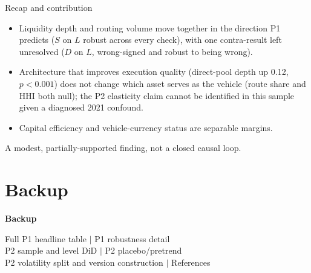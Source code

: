 \documentclass[aspectratio=169]{beamer}
\begin{document}
\begin{frame}{Recap and contribution}
  \begin{itemize}
    \item Liquidity depth and routing volume move together in the direction P1 predicts ($S$ on $L$ robust across every check), with one contra-result left unresolved ($D$ on $L$, wrong-signed and robust to being wrong).
    \item Architecture that improves execution quality (direct-pool depth up 0.12, $p<0.001$) does not change which asset serves as the vehicle (route share and HHI both null); the P2 elasticity claim cannot be identified in this sample given a diagnosed 2021 confound.
    \item Capital efficiency and vehicle-currency status are separable margins.
  \end{itemize}
  \vspace{0.8em}
  \begin{block}{}
    \centering A modest, partially-supported finding, not a closed causal loop.
  \end{block}
\end{frame}

\section{Backup}

\begin{frame}
  \centering
  \vfill
  {\Large \textbf{Backup}}
  \vspace{1em}

  {\small
  Full P1 headline table \quad $\vert$ \quad P1 robustness detail \\
  P2 sample and level DiD \quad $\vert$ \quad P2 placebo/pretrend \\
  P2 volatility split and version construction \quad $\vert$ \quad References
  }
  \vfill
\end{frame}
\end{document}
